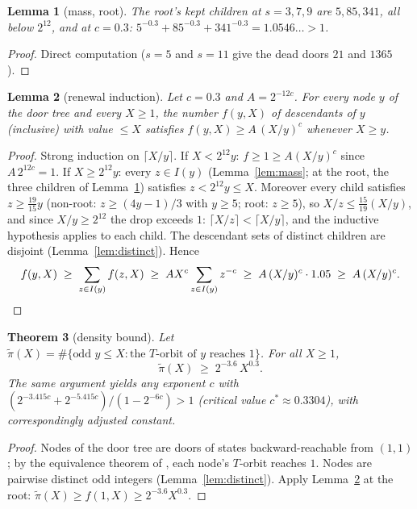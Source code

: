 \documentclass[11pt]{article}
\newtheorem{theorem}{Theorem}[section]
\newtheorem{lemma}[theorem]{Lemma}
\theoremstyle{remark}
\begin{document}
\begin{lemma}[mass, root]\label{lem:rootmass}
The root's kept children at $s = 3, 7, 9$ are $5, 85, 341$, all below $2^{12}$, and at $c = 0.3$: $5^{-0.3} + 85^{-0.3} + 341^{-0.3} = 1.0546\ldots > 1$.
\end{lemma}

\begin{proof}
Direct computation ($s = 5$ and $s = 11$ give the dead doors $21$ and $1365$).
\end{proof}

\begin{lemma}[renewal induction]\label{lem:renewal}
Let $c = 0.3$ and $A = 2^{-12c}$. For every node $y$ of the door tree and every $X \ge 1$, the number $f(y, X)$ of descendants of $y$ (inclusive) with value $\le X$ satisfies $f(y,X) \ge A\,(X/y)^c$ whenever $X \ge y$.
\end{lemma}

\begin{proof}
Strong induction on $\lceil X/y \rceil$. If $X < 2^{12} y$: $f \ge 1 \ge A(X/y)^c$ since $A\,2^{12c} = 1$. If $X \ge 2^{12}y$: every $z \in I(y)$ (Lemma~\ref{lem:mass}; at the root, the three children of Lemma~\ref{lem:rootmass}) satisfies $z < 2^{12} y \le X$. Moreover every child satisfies $z \ge \tfrac{19}{15}y$ (non-root: $z \ge (4y-1)/3$ with $y \ge 5$; root: $z \ge 5$), so $X/z \le \tfrac{15}{19}(X/y)$, and since $X/y \ge 2^{12}$ the drop exceeds $1$: $\lceil X/z \rceil < \lceil X/y \rceil$, and the inductive hypothesis applies to each child. The descendant sets of distinct children are disjoint (Lemma~\ref{lem:distinct}). Hence
\[ f(y,X) \;\ge\; \sum_{z \in I(y)} f(z, X) \;\ge\; A X^c \sum_{z\in I(y)} z^{-c} \;\ge\; A\,(X/y)^c \cdot 1.05 \;\ge\; A\,(X/y)^c. \qedhere \]
\end{proof}

\begin{theorem}[density bound]\label{thm:density}
Let $\tilde\pi(X) = \#\{\text{odd } y \le X : \text{the } T\text{-orbit of } y \text{ reaches } 1\}$. For all $X \ge 1$,
\[ \tilde\pi(X) \;\ge\; 2^{-3.6}\, X^{0.3}. \]
The same argument yields any exponent $c$ with $(2^{-3.415c} + 2^{-5.415c})/(1 - 2^{-6c}) > 1$ (critical value $c^* \approx 0.3304$), with correspondingly adjusted constant.
\end{theorem}

\begin{proof}
Nodes of the door tree are doors of states backward-reachable from $(1,1)$; by the equivalence theorem of \cite{paper1}, each node's $T$-orbit reaches $1$. Nodes are pairwise distinct odd integers (Lemma~\ref{lem:distinct}). Apply Lemma~\ref{lem:renewal} at the root: $\tilde\pi(X) \ge f(1, X) \ge 2^{-3.6}X^{0.3}$.
\end{proof}
\end{document}
